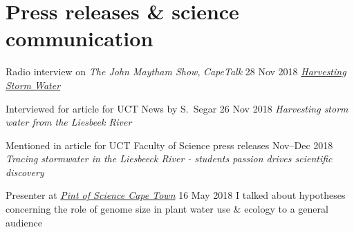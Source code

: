 \documentclass[10pt]{article}
\begin{document}
\section*{Press releases \& science communication} %

\begin{hangparas}{2em}{1}



Radio interview on \textit{The John Maytham Show}, \textit{CapeTalk}
                                                       \hfill 28 Nov 2018 \break
\href{https://www.capetalk.co.za/articles/328900/harvesting-stormwater-from-liesbeek-river-may-aid-ct-water-supply-students-find}
{\textit{Harvesting Storm Water}}

Interviewed for article for UCT News by S.~Segar       \hfill 26 Nov 2018 \break
\textit{Harvesting storm water from the Liesbeek River}

Mentioned in article for UCT Faculty of Science press releases
                                                     \hfill Nov--Dec 2018 \break
\textit{Tracing stormwater in the Liesbeeck River - students passion drives
scientific discovery}


Presenter at \href{http://pintofsciencesa.wixsite.com/pintofsciencesa/uct-planet-earth-16}
{\textit{Pint of Science Cape Town}}                   \hfill 16 May 2018 \break
I talked about hypotheses concerning the role of genome size in plant water use 
\& ecology                                                                \break
to a general audience

\hfill

\end{hangparas}
\end{document}
